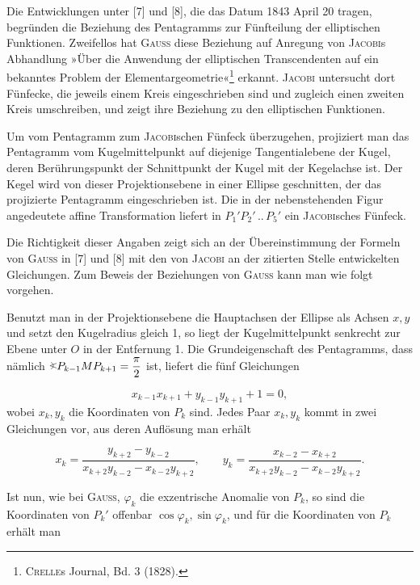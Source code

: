 Die Entwicklungen unter [7] und [8], die das Datum 1843 April 20 tragen, begründen die
Beziehung des Pentagramms zur Fünfteilung der elliptischen Funktionen.
Zweifellos hat \textsc{Gauss} diese Beziehung auf Anregung von \textsc{Jacobi}s Abhandlung »Über die
Anwendung der elliptischen Transcendenten auf ein bekanntes Problem der
Elementargeometrie«\footnote{\textsc{Crelle}s Journal, Bd. 3 (1828).} erkannt. \textsc{Jacobi} untersucht
dort Fünfecke, die jeweils einem Kreis eingeschrieben sind und zugleich einen zweiten Kreis
umschreiben, und zeigt ihre Beziehung zu den elliptischen Funktionen.

Um vom Pentagramm zum \textsc{Jacobi}schen Fünfeck überzugehen, projiziert man
das Pentagramm vom Kugelmittelpunkt auf diejenige Tangentialebene der Kugel, deren
Berührungspunkt der Schnittpunkt der Kugel mit der Kegelachse ist. Der Kegel wird von
dieser Projektionsebene in einer Ellipse geschnitten, der das projizierte Pentagramm
eingeschrieben ist. Die in der nebenstehenden Figur angedeutete affine Transformation liefert in
$P_1'P_2'\,..\,P_5'$ ein \textsc{Jacobi}sches Fünfeck.

\begin{center}\end{center}

Die Richtigkeit dieser Angaben zeigt sich an der Übereinstimmung der Formeln von \textsc{Gauss} in [7]
und [8] mit den von \textsc{Jacobi} an der zitierten Stelle entwickelten Gleichungen. Zum Beweis der
Beziehungen von \textsc{Gauss} kann man wie folgt vorgehen.

Benutzt man in der Projektionsebene die Hauptachsen der Ellipse als Achsen $x, y$ und setzt den
Kugelradius gleich 1, so liegt der Kugelmittelpunkt senkrecht zur Ebene unter $O$ in der
Entfernung 1. Die Grundeigenschaft des Pentagramms, dass nämlich
$\HistAngle P_{k-1}MP_{k+1} = \dfrac{\pi}{2}$ ist, liefert die fünf Gleichungen

\[
x_{k-1}x_{k+1} + y_{k-1}y_{k+1} + 1 = 0,\tag{1}
\]
wobei $x_k, y_k$ die Koordinaten von $P_k$ sind. Jedes Paar $x_k, y_k$ kommt in zwei
Gleichungen vor, aus deren Auflösung man erhält

\[
x_k = \dfrac{y_{k+2}-y_{k-2}}{x_{k+2}y_{k-2}-x_{k-2}y_{k+2}}, \qquad
y_k = \dfrac{x_{k-2}-x_{k+2}}{x_{k+2}y_{k-2}-x_{k-2}y_{k+2}}.\tag{2}
\]

Ist nun, wie bei \textsc{Gauss}, $\varphi_k$ die exzentrische Anomalie von $P_k$, so sind die
Koordinaten von $P_k'$ offenbar $\cos\varphi_k, \sin\varphi_k$, und für die
Koordinaten von $P_k$ erhält man

